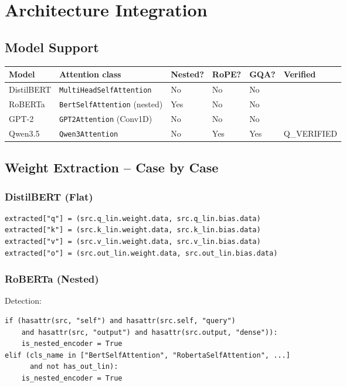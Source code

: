 
\section{Architecture Integration}

\subsection{Model Support}

\begin{table}[H]
\centering
\small
\begin{tabular}{llllll}
\toprule
\textbf{Model} & \textbf{Attention class} & \textbf{Nested?} & \textbf{RoPE?} & \textbf{GQA?} & \textbf{Verified} \\
\midrule
DistilBERT & \texttt{MultiHeadSelfAttention} & No & No & No &  \\
RoBERTa & \texttt{BertSelfAttention} (nested) & Yes & No & No &  \\
GPT-2 & \texttt{GPT2Attention} (Conv1D) & No & No & No &  \\
Qwen3.5 & \texttt{Qwen3Attention} & No & Yes & Yes & {{Q\_VERIFIED}} \\
\bottomrule
\end{tabular}
\end{table}

\subsection{Weight Extraction -- Case by Case}

\subsubsection{DistilBERT (Flat)}

\begin{lstlisting}
extracted["q"] = (src.q_lin.weight.data, src.q_lin.bias.data)
extracted["k"] = (src.k_lin.weight.data, src.k_lin.bias.data)
extracted["v"] = (src.v_lin.weight.data, src.v_lin.bias.data)
extracted["o"] = (src.out_lin.weight.data, src.out_lin.bias.data)
\end{lstlisting}

\subsubsection{RoBERTa (Nested)}

Detection:

\begin{lstlisting}
if (hasattr(src, "self") and hasattr(src.self, "query")
    and hasattr(src, "output") and hasattr(src.output, "dense")):
    is_nested_encoder = True
elif (cls_name in ["BertSelfAttention", "RobertaSelfAttention", ...]
      and not has_out_lin):
    is_nested_encoder = True
\end{lstlisting}


